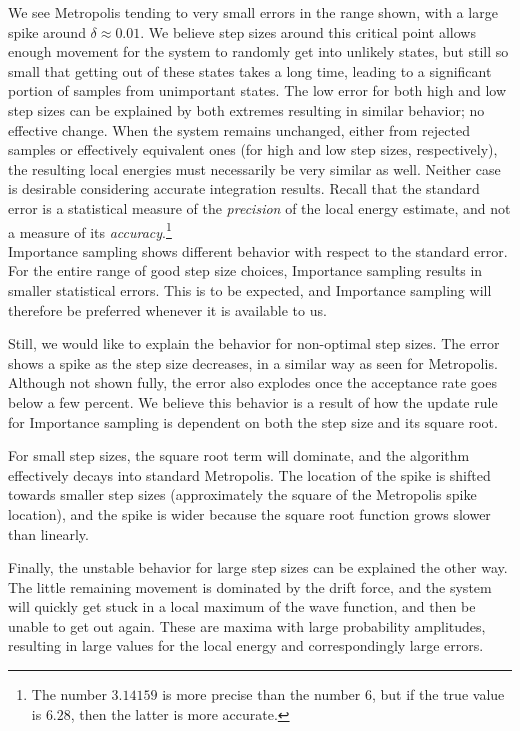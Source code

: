 \documentclass[Thesis.tex]{subfiles}
\begin{document}
We see Metropolis tending to very small errors in the range shown, with a large
spike around $\delta \approx 0.01$. We believe step sizes around this critical
point allows enough movement for the system to randomly get into unlikely
states, but still so small that getting out of these states takes a long time,
leading to a significant portion of samples from unimportant states. The low
error for both high and low step sizes can be explained by both extremes
resulting in similar behavior; no effective change. When the system remains
unchanged, either from rejected samples or effectively equivalent ones (for high
and low step sizes, respectively), the resulting local energies must necessarily
be very similar as well. Neither case is desirable considering accurate
integration results. Recall that the standard error is a statistical measure of
the \emph{precision} of the local energy estimate, and not a measure of its
\emph{accuracy}.\footnote{The number $3.14159$ is more precise than the number
$6$, but if the true value is $6.28$, then the latter is more accurate.}\\

Importance sampling shows different behavior with respect to the standard error.
For the entire range of good step size choices, Importance sampling results in
smaller statistical errors. This is to be expected, and Importance sampling will
therefore be preferred whenever it is available to us.

Still, we would like to explain the behavior for non-optimal step sizes. The
error shows a spike as the step size decreases, in a similar way as seen for
Metropolis. Although not shown fully, the error also explodes once the
acceptance rate goes below a few percent. We believe this behavior is a result
of how the update rule for Importance sampling is dependent on both the step
size and its square root.

For small step sizes, the square root term will dominate, and the algorithm
effectively decays into standard Metropolis. The location of the spike is
shifted towards smaller step sizes (approximately the square of the Metropolis spike location),
and the spike is wider because the square root function grows slower than
linearly.

Finally, the unstable behavior for large step sizes can be explained the other
way. The little remaining movement is dominated by the drift force, and the
system will quickly get stuck in a local maximum of the wave function, and then be
unable to get out again. These are maxima with large probability amplitudes,
resulting in large values for the local energy and correspondingly large errors.
\end{document}
